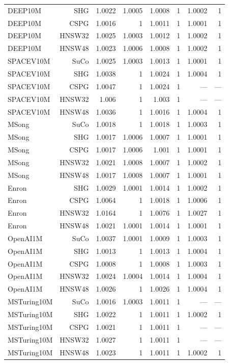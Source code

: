 \begin{table}[t]
\begin{tabular}{lrrrrrrr}
DEEP10M & SHG & 1.0022 & 1.0005 & 1.0008 & 1 & 1.0002 & 1 \\
DEEP10M & CSPG & 1.0016 & 1 & 1.0011 & 1 & 1.0001 & 1 \\
DEEP10M & HNSW32 & 1.0025 & 1.0003 & 1.0012 & 1 & 1.0002 & 1 \\
DEEP10M & HNSW48 & 1.0023 & 1.0006 & 1.0008 & 1 & 1.0002 & 1 \\
SPACEV10M & SuCo & 1.0025 & 1.0003 & 1.0013 & 1 & 1.0001 & 1 \\
SPACEV10M & SHG & 1.0038 & 1 & 1.0024 & 1 & 1.0004 & 1 \\
SPACEV10M & CSPG & 1.0047 & 1 & 1.0024 & 1 & — & — \\
SPACEV10M & HNSW32 & 1.006 & 1 & 1.003 & 1 & — & — \\
SPACEV10M & HNSW48 & 1.0036 & 1 & 1.0016 & 1 & 1.0004 & 1 \\
MSong & SuCo & 1.0018 & 1 & 1.0018 & 1 & 1.0003 & 1 \\
MSong & SHG & 1.0017 & 1.0006 & 1.0007 & 1 & 1.0001 & 1 \\
MSong & CSPG & 1.0017 & 1.0006 & 1.001 & 1 & 1.0001 & 1 \\
MSong & HNSW32 & 1.0021 & 1.0008 & 1.0007 & 1 & 1.0002 & 1 \\
MSong & HNSW48 & 1.0017 & 1.0008 & 1.0007 & 1 & 1.0001 & 1 \\
Enron & SHG & 1.0029 & 1.0001 & 1.0014 & 1 & 1.0002 & 1 \\
Enron & CSPG & 1.0064 & 1 & 1.0018 & 1 & 1.0006 & 1 \\
Enron & HNSW32 & 1.0164 & 1 & 1.0076 & 1 & 1.0027 & 1 \\
Enron & HNSW48 & 1.0021 & 1.0001 & 1.0014 & 1 & 1.0001 & 1 \\
OpenAI1M & SuCo & 1.0037 & 1.0001 & 1.0009 & 1 & 1.0003 & 1 \\
OpenAI1M & SHG & 1.0013 & 1 & 1.0013 & 1 & 1.0004 & 1 \\
OpenAI1M & CSPG & 1.0008 & 1 & 1.0008 & 1 & 1.0003 & 1 \\
OpenAI1M & HNSW32 & 1.0024 & 1.0004 & 1.0014 & 1 & 1.0004 & 1 \\
OpenAI1M & HNSW48 & 1.0026 & 1 & 1.0026 & 1 & 1.0004 & 1 \\
MSTuring10M & SuCo & 1.0016 & 1.0003 & 1.0011 & 1 & — & — \\
MSTuring10M & SHG & 1.0022 & 1 & 1.0011 & 1 & 1.0002 & 1 \\
MSTuring10M & CSPG & 1.0021 & 1 & 1.0011 & 1 & — & — \\
MSTuring10M & HNSW32 & 1.0027 & 1 & 1.0011 & 1 & — & — \\
MSTuring10M & HNSW48 & 1.0023 & 1 & 1.0011 & 1 & 1.0002 & 1 \\
\bottomrule
\end{tabular}
\end{table}
